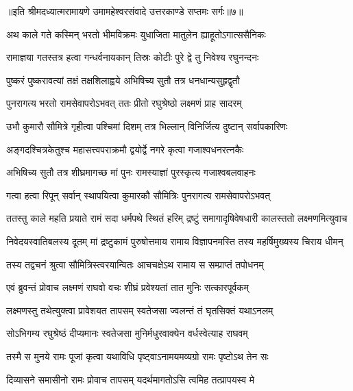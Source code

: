 {॥इति श्रीमदध्यात्मरामायणे उमामहेश्वरसंवादे उत्तरकाण्डे सप्तमः
सर्गः॥७॥
}





\twolineshloka
{अथ काले गते कस्मिन् भरतो भीमविक्रमः}
{युधाजिता मातुलेन ह्याहूतोऽगात्ससैनिकः} %

\twolineshloka
{रामाज्ञया गतस्तत्र हत्वा गन्धर्वनायकान्}
{तिस्रः कोटीः पुरे द्वे तु निवेश्य रघुनन्दनः} %

\twolineshloka
{पुष्करं पुष्करावत्यां तक्षं तक्षशिलाह्वये}
{अभिषिच्य सुतौ तत्र धनधान्यसुहृद्वृतौ} %

\twolineshloka
{पुनरागत्य भरतो रामसेवापरोऽभवत्}
{ततः प्रीतो रघुश्रेष्ठो लक्ष्मणं प्राह सादरम्} %

\twolineshloka
{उभौ कुमारौ सौमित्रे गृहीत्वा पश्चिमां दिशम्}
{तत्र भिल्लान् विनिर्जित्य दुष्टान् सर्वापकारिणः} %

\twolineshloka
{अङ्गदश्चित्रकेतुश्च महासत्त्वपराक्रमौ}
{द्वयोर्द्वे नगरे कृत्वा गजाश्वधनरत्नकैः} %

\twolineshloka
{अभिषिच्य सुतौ तत्र शीघ्रमागच्छ मां पुनः}
{रामस्याज्ञां पुरस्कृत्य गजाश्वबलवाहनः} %

\twolineshloka
{गत्वा हत्वा रिपून् सर्वान् स्थापयित्वा कुमारकौ}
{सौमित्रिः पुनरागत्य रामसेवापरोऽभवत्} %

\fourlineindentedshloka
{ततस्तु काले महति प्रयाते}
{रामं सदा धर्मपथे स्थितं हरिम्}
{द्रष्टुं समागादृषिवेषधारी}
{कालस्ततो लक्ष्मणमित्युवाच} %

\fourlineindentedshloka
{निवेदयस्वातिबलस्य दूतम्}
{मां द्रष्टुकामं पुरुषोत्तमाय}
{रामाय विज्ञापनमस्ति तस्य}
{महर्षिमुख्यस्य चिराय धीमन्} %

\twolineshloka
{तस्य तद्वचनं श्रुत्वा सौमित्रिस्त्वरयान्वितः}
{आचचक्षेऽथ रामाय स सम्प्राप्तं तपोधनम्} %

\twolineshloka
{एवं ब्रुवन्तं प्रोवाच लक्ष्मणं राघवो वचः}
{शीघ्रं प्रवेश्यतां तात मुनिः सत्कारपूर्वकम्} %

\twolineshloka
{लक्ष्मणस्तु तथेत्युक्त्वा प्रावेशयत तापसम्}
{स्वतेजसा ज्वलन्तं तं घृतसिक्तं यथाऽनलम्} %

\twolineshloka
{सोऽभिगम्य रघुश्रेष्ठं दीप्यमानः स्वतेजसा}
{मुनिर्मधुरवाक्येन वर्धस्वेत्याह राघवम्} %

\twolineshloka
{तस्मै स मुनये रामः पूजां कृत्वा यथाविधि}
{पृष्ट्वाऽनामयमव्यग्रो रामः पृष्टोऽथ तेन सः} %

\twolineshloka
{दिव्यासने समासीनो रामः प्रोवाच तापसम्}
{यदर्थमागतोऽसि त्वमिह तत्प्रापयस्व मे} %

